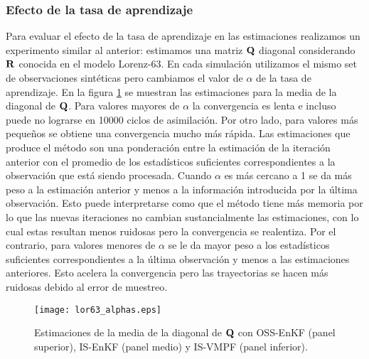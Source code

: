 \subsubsection{Efecto de la tasa de aprendizaje}
Para evaluar el efecto de la tasa de aprendizaje en las estimaciones realizamos un experimento similar al anterior: estimamos una matriz $\mathbf{Q}$ diagonal considerando $\mathbf{R}$ conocida en el modelo Lorenz-63. En cada simulación utilizamos el mismo set de observaciones sintéticas pero cambiamos el valor de $\alpha$ de la tasa de aprendizaje. En la figura \ref{fig:lor63_alphas} se muestran las estimaciones para la media de la diagonal de $\mathbf{Q}$. Para valores mayores de $\alpha$ la convergencia es lenta e incluso puede no lograrse en 10000 ciclos de asimilación. Por otro lado, para valores más pequeños se obtiene una convergencia mucho más rápida. Las estimaciones que produce el método son una ponderación entre la estimación de la iteración anterior con el promedio de los estadísticos suficientes correspondientes a la observación que está siendo procesada. Cuando $\alpha$ es más cercano a 1 se da más peso a la estimación anterior y menos a la información introducida por la última observación. Esto puede interpretarse como que el método tiene más memoria por lo que las nuevas iteraciones no cambian sustancialmente las estimaciones, con lo cual estas resultan menos ruidosas pero la convergencia se realentiza. Por el contrario, para valores menores de $\alpha$ se le da mayor peso a los estadísticos suficientes correspondientes a la última observación y menos a las estimaciones anteriores. Esto acelera la convergencia pero las trayectorias se hacen más ruidosas debido al error de muestreo.
\begin{figure}[h]
    \centering
    \texttt{[image: lor63\_alphas.eps]}
    \caption{Estimaciones de la media de la diagonal de $\mathbf{Q}$ con OSS-EnKF (panel superior), IS-EnKF (panel medio) y IS-VMPF (panel inferior).}
    \label{fig:lor63_alphas}
\end{figure}

